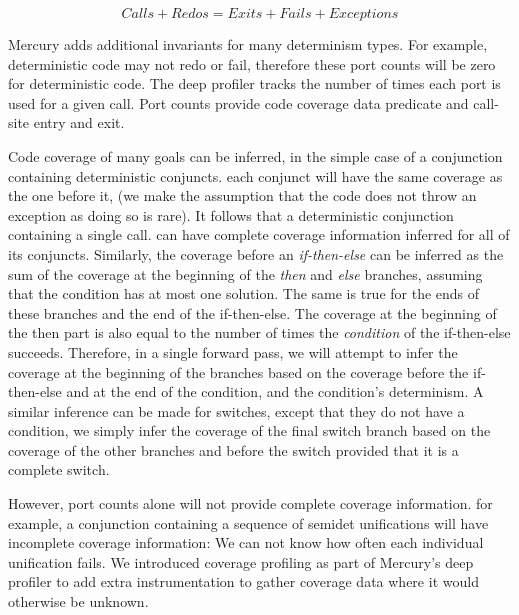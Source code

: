 \begin{equation*}
Calls + Redos = Exits + Fails + Exceptions
\end{equation*}

\noindent
Mercury adds additional invariants for many determinism types.
For example, deterministic code may not redo or fail,
therefore these port counts will be zero for deterministic code.
The deep profiler tracks the number of times each port is used for a given
call.
Port counts provide code coverage data predicate and call-site entry and exit.

Code coverage of many goals can be inferred,
in the simple case of a conjunction containing deterministic conjuncts.
each conjunct will have the same coverage as the one before it,
(we make the assumption that the code does not throw an exception
as doing so is rare).
It follows that a deterministic conjunction containing a single call.
can have complete coverage information inferred for all of its conjuncts.
Similarly,
the coverage before an \emph{if-then-else} can be inferred as the sum
of the coverage at the beginning of the \emph{then} and \emph{else}
branches,
assuming that the condition has at most one solution.
The same is true for the ends of these branches and the end of the
if-then-else.
The coverage at the beginning of the then part is also equal to the
number of times the \emph{condition} of the if-then-else succeeds.
Therefore,
in a single forward pass,
we will attempt to infer the coverage at the beginning of the branches
based on the coverage before the if-then-else and at the end of the
condition,
and the condition's determinism.
A similar inference can be made for switches,
except that they do not have a condition,
we simply infer the
coverage of the final switch branch based on the coverage of the other
branches and before the switch provided that it is a complete switch.

However, port counts alone will not provide complete coverage information.
for example, a conjunction containing a sequence of semidet
unifications will have incomplete coverage information:
We can not know how often each individual unification fails.
We introduced coverage profiling as part of Mercury's deep profiler to
add extra instrumentation to gather coverage data where it would
otherwise be unknown.

